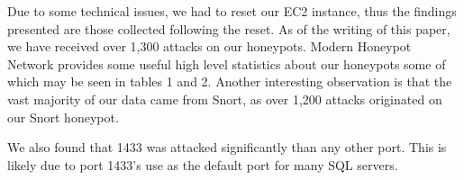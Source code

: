 Due to some technical issues, we had to reset our EC2 instance, thus the findings presented are those collected following the reset. As of the writing of this paper, we have received over 1,300 attacks on our honeypots. Modern Honeypot Network provides some useful high level statistics about our honeypots some of which may be seen in tables 1 and 2. Another interesting observation is that the vast majority of our data came from Snort, as over 1,200 attacks originated on our Snort honeypot.

We also found that 1433 was attacked significantly than any other port. This is likely due to port 1433's use as the default port for many SQL servers.


\begin{table}[H]
\caption{Top Five Individual Detected IP Addresses} \label{tab:ips}
\end{table}

\begin{table}[H]
\caption{Top Five Attacked Ports} \label{tab:ports}
\end{table}

